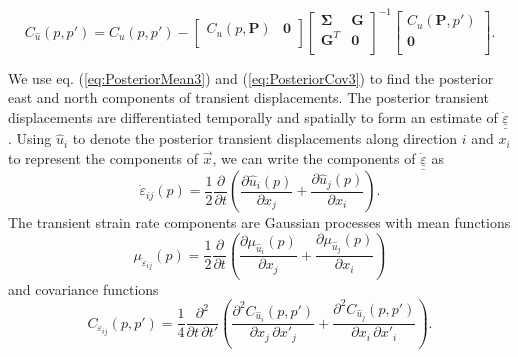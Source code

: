 \documentclass[10pt,letter]{article}
\newcommand*{\du}[1]{\underline{\underline{#1}}}
\begin{document}
\begin{equation}\label{eq:PosteriorCov3}
C_{\hat{u}}(p,p') = C_u(p,p') - 
                    \left[\begin{array}{cc}
                          C_u(p,\bm{P}) & \bm{0} \\
                          \end{array}\right]
                    \left[\begin{array}{cc}
                          \bm{\Sigma} & \bm{G} \\
                          \bm{G}^T  & \bm{0} \\
                          \end{array}\right]^{-1}
                    \left[\begin{array}{c}
                          C_u(\bm{P},p') \\
                          \bm{0} \\
                          \end{array}\right].
\end{equation}

We use eq. (\ref{eq:PosteriorMean3}) and (\ref{eq:PosteriorCov3}) to find the posterior east and north components of transient displacements. The posterior transient displacements are differentiated temporally and spatially to form an estimate of $\dot{\du{\varepsilon}}$. Using $\hat{u}_i$ to denote the posterior transient displacements along direction $i$ and $x_i$ to represent the components of $\vec{x}$, we can write the components of $\dot{\du{\varepsilon}}$ as 
\begin{equation}\label{eq:StrainRate}
\dot{\varepsilon}_{ij}(p) = \frac{1}{2} \frac{\partial}{\partial t} \left(
                                        \frac{\partial \hat{u}_i(p)}{\partial x_j} +  
                                        \frac{\partial \hat{u}_j(p)}{\partial x_i}\right).
\end{equation}
The transient strain rate components are Gaussian processes with mean functions
\begin{equation}\label{eq:StrainMean}
\mu_{\dot{\varepsilon}_{ij}}(p) = \frac{1}{2}\frac{\partial}{\partial t}\left(
                                  \frac{\partial \mu_{\hat{u}_i}(p)}{\partial x_j} + 
                                  \frac{\partial \mu_{\hat{u}_j}(p)}{\partial x_i} \right)
\end{equation} 
and covariance functions
\begin{equation}\label{eq:StrainCov}
C_{\dot{\varepsilon}_{ij}}(p,p') = \frac{1}{4} \frac{\partial^2}{\partial t \, \partial t'}\left(
                                   \frac{\partial^2 C_{\hat{u}_i}(p,p')}{\partial x_j \, \partial x'_j} + 
                                   \frac{\partial^2 C_{\hat{u}_j}(p,p')}{\partial x_i \, \partial x'_i} \right).
\end{equation} 
\end{document}
